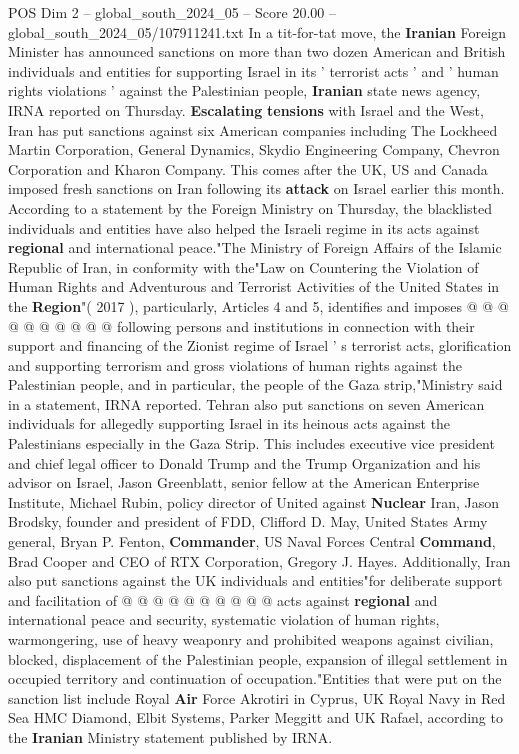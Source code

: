 \begin{textsample}{POS Dim 2 – global\_south\_2024\_05 – Score 20.00 – global\_south\_2024\_05/107911241.txt}  \label{ex:f2_pos_222}
In a tit-for-tat move, the \textbf{Iranian} Foreign Minister has announced sanctions on more than two dozen American and British individuals and entities for supporting Israel in its ' terrorist acts ' and ' human rights violations ' against the Palestinian people, \textbf{Iranian} state news agency, IRNA reported on Thursday. \textbf{Escalating} \textbf{tensions} with Israel and the West, Iran has put sanctions against six American companies including The Lockheed Martin Corporation, General Dynamics, Skydio Engineering Company, Chevron Corporation and Kharon Company.
This comes after the UK, US and Canada imposed fresh sanctions on Iran following its \textbf{attack} on Israel earlier this month.
According to a statement by the Foreign Ministry on Thursday, the blacklisted individuals and entities have also helped the Israeli regime in its acts against \textbf{regional} and international peace."The Ministry of Foreign Affairs of the Islamic Republic of Iran, in conformity with the"Law on Countering the Violation of Human Rights and Adventurous and Terrorist Activities of the United States in the \textbf{Region}"( 2017 ), particularly, Articles 4 and 5, identifies and imposes @ @ @ @ @ @ @ @ @ @ following persons and institutions in connection with their support and financing of the Zionist regime of Israel ' s terrorist acts, glorification and supporting terrorism and gross violations of human rights against the Palestinian people, and in particular, the people of the Gaza strip,"Ministry said in a statement, IRNA reported.
Tehran also put sanctions on seven American individuals for allegedly supporting Israel in its heinous acts against the Palestinians especially in the Gaza Strip.
This includes executive vice president and chief legal officer to Donald Trump and the Trump Organization and his advisor on Israel, Jason Greenblatt, senior fellow at the American Enterprise Institute, Michael Rubin, policy director of United against \textbf{Nuclear} Iran, Jason Brodsky, founder and president of FDD, Clifford D.
May, United States Army general, Bryan P.
Fenton, \textbf{Commander}, US Naval Forces Central \textbf{Command}, Brad Cooper and CEO of RTX Corporation, Gregory J.
Hayes.
Additionally, Iran also put sanctions against the UK individuals and entities"for deliberate support and facilitation of @ @ @ @ @ @ @ @ @ @ acts against \textbf{regional} and international peace and security, systematic violation of human rights, warmongering, use of heavy weaponry and prohibited weapons against civilian, blocked, displacement of the Palestinian people, expansion of illegal settlement in occupied territory and continuation of occupation."Entities that were put on the sanction list include Royal \textbf{Air} Force Akrotiri in Cyprus, UK Royal Navy in Red Sea HMC Diamond, Elbit Systems, Parker Meggitt and UK Rafael, according to the \textbf{Iranian} Ministry statement published by IRNA.

\end{textsample}
